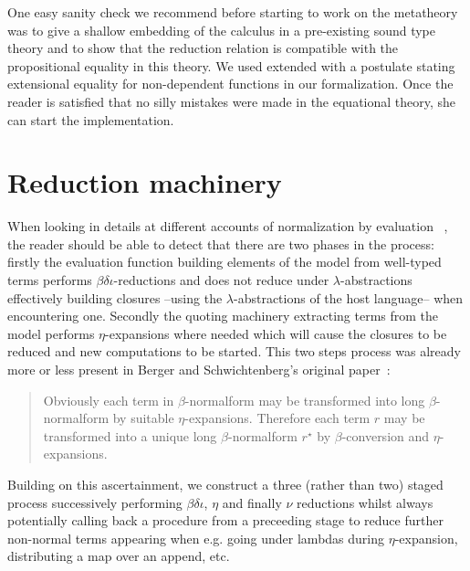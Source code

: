 One easy sanity check we recommend before starting to work on the metatheory was
to give a shallow embedding of the calculus in a pre-existing sound type theory
and to show that the reduction relation is compatible with the propositional
equality in this theory. We used \agda{} extended with a postulate stating
extensional equality for non-dependent functions in our formalization. Once the
reader is satisfied that no silly mistakes were made in the equational theory,
she can start the implementation.







\section{Reduction machinery}

When looking in details at different accounts of normalization by evaluation
~\cite{BerSch91,CoqDyb97,Coquand02,NbeEffects}, the reader should be able to
detect that there are two phases in the process:
firstly the evaluation function building elements of the model from well-typed
terms performs $\beta\delta\iota$-reductions and does not reduce under
$\lambda$-abstractions effectively building closures --using the $\lambda$-abstractions
of the host language-- when encountering one.
Secondly the quoting machinery extracting terms from the model performs $\eta$-expansions
where needed which will cause the closures to be reduced and new computations to
be started. This two steps process was already more or less present in Berger and
Schwichtenberg's original paper~\cite{BerSch91}:
\begin{quote}Obviously each term in $\beta$-normalform may be transformed into
long $\beta$-normalform by suitable $\eta$-expansions. Therefore each term $r$
may be transformed into a unique long $\beta$-normalform $r^\star$ by
$\beta$-conversion and $\eta$-expansions.
\end{quote}

Building on this ascertainment, we construct a three (rather than two) staged
process successively performing $\beta\delta\iota$, $\eta$ and finally $\nu$
reductions whilst always potentially calling back a procedure from a preceeding
stage to reduce further non-normal terms appearing when e.g. going under lambdas
during $\eta$-expansion, distributing a map over an append, etc.

